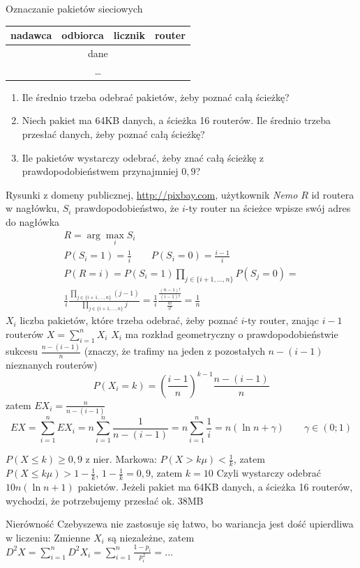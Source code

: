 \documentclass{mp}
\begin{document}
\begin{frame}{Oznaczanie pakietów sieciowych}
\begin{center}
\begin{tikzpicture}
\end{tikzpicture}
\end{center}
{
\begin{center}
\begin{tabular}{|p{2cm}|p{2cm}|p{1cm}|p{2cm}|}
\hline
nadawca & odbiorca & licznik & \textcolor{color2}{router} \\
\hline
\multicolumn{4}{|c|}{dane} \\
\multicolumn{4}{|c|}{\ldots} \\
\hline
\end{tabular}
\end{center}
}
{
	\begin{enumerate}
		\item<3-> Ile średnio trzeba odebrać pakietów, żeby poznać całą ścieżkę?
		\item<4-> Niech pakiet ma 64KB danych, a ścieżka 16 routerów. Ile średnio trzeba przesłać danych, żeby poznać całą ścieżkę?
		\item<4-> Ile pakietów wystarczy odebrać, żeby znać całą ścieżkę z prawdopodobieństwem przynajmniej $0{,}9$?
	\end{enumerate}
}
\vfill
\tiny{Rysunki z domeny publicznej, \url{http://pixbay.com}, użytkownik \emph{Nemo}}
{
$R$ id routera w nagłówku, $S_i$ prawdopodobieństwo, że $i$-ty router na ścieżce wpisze swój adres do nagłówka
\begin{gather*}
R=\arg\max_i S_i\\
P(S_i=1)=\frac{1}{i} \qquad P(S_i=0)=\frac{i-1}{i} \\
P(R=i)=P(S_i=1)\prod_{j\in\{i+1,\ldots,n\}} P(S_j=0)=\\
\frac{1}{i}\frac{\prod_{j\in\{i+1,\ldots,n\}}(j-1)}{\prod_{j\in\{i+1,\ldots,n\}}j}=\frac{1}{i}\frac{\frac{(n-1)!}{(i-1)!}}{\frac{n!}{i!}}=\frac{1}{n}
\end{gather*}
}
{
$X_i$ liczba pakietów, które trzeba odebrać, żeby poznać $i$-ty router, znając $i-1$ routerów
$X=\sum_{i=1}^n X_i$
$X_i$ ma rozkład geometryczny o prawdopodobieństwie sukcesu $\frac{n-(i-1)}{n}$ (znaczy, że trafimy na jeden z pozostałych $n-(i-1)$ nieznanych routerów)
\[P(X_i=k)=\left(\frac{i-1}{n}\right)^{k-1}\frac{n-(i-1)}{n} \]
zatem $EX_i=\frac{n}{n-(i-1)}$
\[EX=\sum_{i=1}^n EX_i=n\sum_{i=1}^n\frac{1}{n-(i-1)}=n\sum_{i=1}^{n}\frac{1}{i}=n(\ln n+\gamma) \qquad \gamma\in\left(0;1\right)\]
}
{
$P(X\leq k)\geq 0{,}9$
z nier. Markowa: $P(X>k\mu)<\frac{1}{k}$, zatem $P(X\leq k\mu)>1-\frac{1}{k}$, $1-\frac{1}{k}=0{,}9$, zatem $k=10$
Czyli wystarczy odebrać $10n(\ln n+1)$ pakietów. Jeżeli pakiet ma 64KB danych, a ścieżka 16 routerów, wychodzi, że potrzebujemy przesłać ok. 38MB

Nierówność Czebyszewa nie zastosuje się łatwo, bo wariancja jest dość upierdliwa w liczeniu:
Zmienne $X_i$ są niezależne, zatem $D^2X=\sum_{i=1}^n D^2X_i=\sum_{i=1}^n \frac{1-p_i}{p_i^2}=\ldots $
}
\end{frame}
\end{document}

